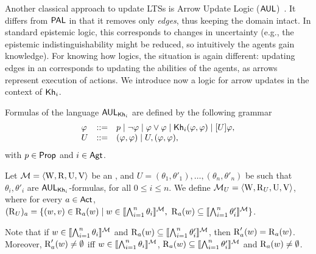 
Another classical approach to update LTSs is Arrow Update Logic 
($\mathsf{AUL}$)~\cite{KooiR11}. It differs from $\textsf{PAL}$ in that it removes only \emph{edges}, thus keeping the domain intact. In standard epistemic logic, this corresponds to changes in uncertainty (e.g., the epistemic indistinguishability might be reduced, so intuitively the agents gain knowledge). For knowing how logics, the situation is again different: updating edges in an \lts corresponds to updating the abilities of the agents, as arrows represent execution of actions. We introduce now a logic for arrow updates in the context of ${\sf Kh}_i$.

\medskip 

\begin{definition}\label{def:arrowsyntax}
Formulas of the language $\mathsf{AUL}_{{\sf Kh}_i}$ are defined by the following grammar
\[
\begin{array}{lcl}
\varphi & ::= & p \mid \neg\varphi \mid \varphi\vee\varphi \mid
{\sf Kh}_i(\varphi,\varphi) \mid [U]\varphi, \\
U & ::= & (\varphi,\varphi) \mid U,(\varphi,\varphi),
\end{array}
\]
with $p \in {\rm \sf Prop}$ and $i\in{\rm \sf Agt}$. 
\end{definition}

\medskip 

\begin{definition}
Let $\mathcal{M} = \langle \operatorname{W}, \operatorname{R}, \operatorname{U}, \operatorname{V} \rangle$ be an \ults, and $U = (\theta_1,\theta'_1),\dots,(\theta_n,\theta'_n)$ be such that $\theta_i,\theta'_i$ are $\mathsf{AUL}_{{\sf Kh}_i}$-formulas, for all $0\leq i \leq n$. We define $\mathcal{M}_{{U}} = \langle \operatorname{W}, \operatorname{R}_{{U}}, \operatorname{U},\operatorname{V} \rangle$, where for every $a\in{\rm \sf Act}$,
	$(\operatorname{R}_{{U}})_a = \{ (w,v) \in \operatorname{R}_a(w) \mid w \in \llbracket \bigwedge_{i=1}^n \theta_i \rrbracket^{\mathcal{M}} \text{, } \operatorname{R}_a(w) \subseteq \llbracket \bigwedge_{i=1}^n \theta'_i \rrbracket^{\mathcal{M}} \}$.
\end{definition}

\medskip

Note that if $w \in \llbracket \bigwedge_{i=1}^n \theta_i \rrbracket^{\mathcal{M}}$ and $\operatorname{R}_a(w) \subseteq \llbracket \bigwedge_{i=1}^n \theta'_i \rrbracket^{\mathcal{M}}$, then $\operatorname{R}'_a(w) = \operatorname{R}_a(w)$.
Moreover, $\operatorname{R}'_a(w) \neq \emptyset$ iff $w \in \llbracket \bigwedge_{i=1}^n \theta_i \rrbracket^{\mathcal{M}}$, $\operatorname{R}_a(w) \subseteq \llbracket \bigwedge_{i=1}^n \theta'_i \rrbracket^{\mathcal{M}}$ and $\operatorname{R}_a(w) \neq \emptyset$.

